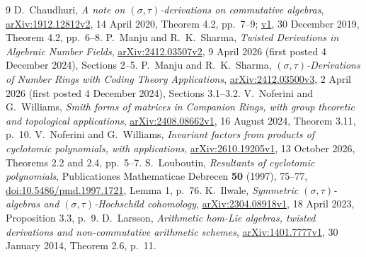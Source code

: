 \documentclass[11pt]{article}
\begin{document}
\begin{thebibliography}{9}
 D.~Chaudhuri,
\emph{A note on $(\sigma,\tau)$-derivations on commutative algebras},
\href{https://arxiv.org/abs/1912.12812v2}{arXiv:1912.12812v2},
14 April 2020, Theorem 4.2, pp.~7--9;
\href{https://arxiv.org/abs/1912.12812v1}{v1}, 30 December 2019,
Theorem 4.2, pp.~6--8.
 P.~Manju and R.~K.~Sharma,
\emph{Twisted Derivations in Algebraic Number Fields},
\href{https://arxiv.org/abs/2412.03507v2}{arXiv:2412.03507v2},
9 April 2026 (first posted 4 December 2024), Sections 2--5.
 P.~Manju and R.~K.~Sharma,
\emph{$(\sigma,\tau)$-Derivations of Number Rings with Coding Theory Applications},
\href{https://arxiv.org/abs/2412.03500v3}{arXiv:2412.03500v3},
2 April 2026 (first posted 4 December 2024), Sections 3.1--3.2.
 V.~Noferini and G.~Williams,
\emph{Smith forms of matrices in Companion Rings, with group theoretic
and topological applications},
\href{https://arxiv.org/abs/2408.08662v1}{arXiv:2408.08662v1},
16 August 2024, Theorem 3.11, p.~10.
 V.~Noferini and G.~Williams,
\emph{Invariant factors from products of cyclotomic polynomials, with applications},
\href{https://arxiv.org/abs/2610.19205v1}{arXiv:2610.19205v1},
13 October 2026, Theorems 2.2 and 2.4, pp.~5--7.
 S.~Louboutin,
\emph{Resultants of cyclotomic polynomials},
Publicationes Mathematicae Debrecen \textbf{50} (1997), 75--77,
\href{https://doi.org/10.5486/pmd.1997.1721}{doi:10.5486/pmd.1997.1721},
Lemma 1, p.~76.
 K.~Ilwale,
\emph{Symmetric $(\sigma,\tau)$-algebras and $(\sigma,\tau)$-Hochschild cohomology},
\href{https://arxiv.org/abs/2304.08918v1}{arXiv:2304.08918v1},
18 April 2023, Proposition 3.3, p.~9.
 D.~Larsson,
\emph{Arithmetic hom-Lie algebras, twisted derivations and non-commutative
arithmetic schemes},
\href{https://arxiv.org/abs/1401.7777v1}{arXiv:1401.7777v1},
30 January 2014, Theorem 2.6, p.~11.
\end{thebibliography}
\end{document}
